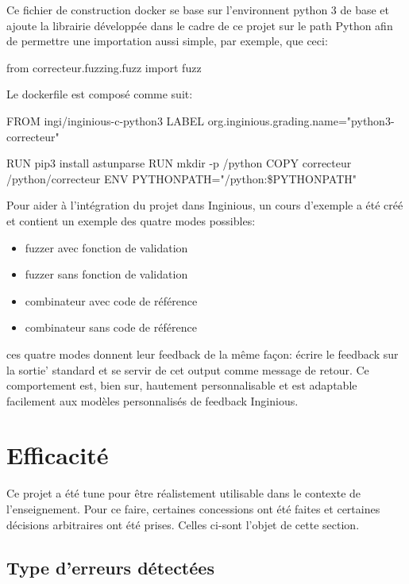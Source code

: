 \documentclass[a4paper]{report}
\begin{document}
Ce fichier de construction docker se base sur l'environnent python 3 de base et ajoute la librairie développée dans le cadre de ce projet sur le path Python afin de permettre une importation aussi simple, par exemple, que ceci:

\begin{python}
from correcteur.fuzzing.fuzz import fuzz
\end{python}

Le dockerfile est composé comme suit:
\begin{python}
FROM ingi/inginious-c-python3
LABEL org.inginious.grading.name="python3-correcteur"


RUN pip3 install astunparse
RUN mkdir -p /python
COPY correcteur /python/correcteur
ENV PYTHONPATH="/python:\${PYTHONPATH}"
\end{python}


Pour aider à l'intégration du projet dans Inginious, un cours d'exemple a été créé et contient un exemple des quatre modes possibles:
\begin{itemize}
\item fuzzer avec fonction de validation
\item fuzzer sans fonction de validation
\item combinateur avec code de référence
\item combinateur sans code de référence
\end{itemize}
ces quatre modes donnent leur feedback de la même façon: écrire le feedback sur la sortie' standard et se servir de cet output comme message de retour.
Ce comportement est, bien sur, hautement personnalisable et est adaptable facilement aux modèles personnalisés de feedback Inginious.

\section{Efficacité}

Ce projet a été tune pour être réalistement utilisable dans le contexte de l'enseignement.
Pour ce faire, certaines concessions  ont été faites et certaines décisions arbitraires ont été prises.
Celles ci-sont l'objet de cette section.

\subsection{Type d'erreurs détectées}

\end{document}
